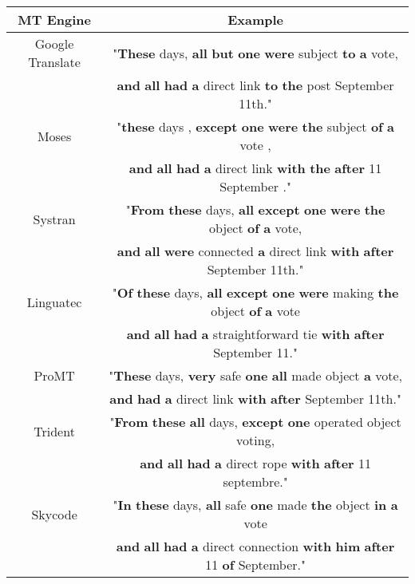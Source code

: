 \documentclass[11pt]{article}
\begin{document}
\begin{table*}[t]
  \centering
  \begin{tabular}{*{2}{c}}
    \hline
    MT Engine & Example \\
    \hline
    Google Translate & "\textbf{These} days, \textbf{all} \textbf{but} \textbf{one} \textbf{were} subject \textbf{to} \textbf{a} vote, \\
    & \textbf{and} \textbf{all} \textbf{had} \textbf{a} direct link \textbf{to} \textbf{the} post September 11th." \\
	\hline
    Moses & "\textbf{these} days , \textbf{except} \textbf{one} \textbf{were} \textbf{the} subject \textbf{of} \textbf{a} vote , \\
	& \textbf{and} \textbf{all} \textbf{had} \textbf{a} direct link \textbf{with} \textbf{the} \textbf{after} 11 September ." \\
	\hline
    Systran & "\textbf{From} \textbf{these} days, \textbf{all} \textbf{except} \textbf{one} \textbf{were} \textbf{the} object \textbf{of} \textbf{a} vote, \\
 	& \textbf{and} \textbf{all} \textbf{were} connected \textbf{a} direct link \textbf{with} \textbf{after} September 11th." \\
    \hline
	Linguatec & "\textbf{Of} \textbf{these} days, \textbf{all} \textbf{except} \textbf{one} \textbf{were} making \textbf{the} object \textbf{of} \textbf{a} vote \\
	& \textbf{and} \textbf{all} \textbf{had} \textbf{a} straightforward tie \textbf{with} \textbf{after} September 11." \\
    \hline
	ProMT & "\textbf{These} days, \textbf{very} safe \textbf{one} \textbf{all} made object \textbf{a} vote, \\ 
	& \textbf{and} \textbf{had} \textbf{a} direct link \textbf{with} \textbf{after} September 11th." \\
    \hline
	Trident & "\textbf{From} \textbf{these} \textbf{all} days, \textbf{except} \textbf{one} operated object voting, \\
	& \textbf{and} \textbf{all} \textbf{had} \textbf{a} direct rope \textbf{with} \textbf{after} 11 septembre." \\
    \hline
	Skycode & "\textbf{In} \textbf{these} days, \textbf{all} safe \textbf{one} made \textbf{the} object \textbf{in} \textbf{a} vote \\
	& \textbf{and} \textbf{all} \textbf{had} \textbf{a} direct connection \textbf{with} \textbf{him} \textbf{after} 11 \textbf{of} September." \\

\end{tabular}
\end{table*}
\end{document}
